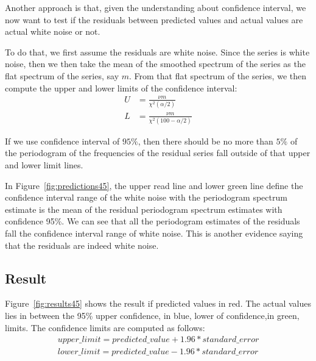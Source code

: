\documentclass[12pt]{article}
\begin{document}
Another approach is that, given the understanding about confidence interval, we
now want to test if the residuals between predicted values and actual values are
actual white noise or not.

To do that, we first assume the residuals are white noise. Since the series is
white noise, then we then take the mean of the smoothed spectrum of the series
as the flat spectrum of the series, say $m$. From that flat spectrum of the
series, we then compute the upper and lower limits of the confidence interval:
\begin{align}
U &= \frac{\nu m}{\chi^2(\alpha/2)}\\
L &= \frac{\nu m}{\chi^2(100-\alpha/2)}
\end{align}

If we use confidence interval of $95\%$, then there should be no more than $5\%$
of the periodogram of the frequencies of the residual series fall outside of
that upper and lower limit lines.

In Figure~\ref{fig:predictions45}, the upper read line and lower green line
define the confidence interval range of the white noise with the periodogram
spectrum estimate is the mean of the residual periodogram spectrum estimates with
confidence 95\%. We can see that all the periodogram estimates of the residuals
fall the confidence interval range of white noise. This is another evidence
saying that the residuals are indeed white noise.


\subsection{Result}
Figure~\ref{fig:results45} shows the result if predicted values in red. The
actual values lies in between the 95\% upper confidence, in blue, lower of
confidence,in green, limits. The confidence limits are computed as follows:
\begin{align}
upper\_limit = predicted\_value + 1.96*standard\_error\\
lower\_limit = predicted\_value - 1.96*standard\_error
\end{align}
\end{document}
